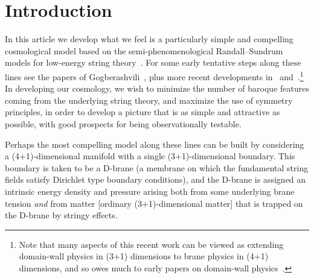 \documentclass[a4paper,12pt]{article}
\begin{document}
\def\d{{\mathrm d}}
\def\ie{{\em i.e.\/}}
\def\eg{{\em e.g.\/}}
\def\etc{{\em etc.\/}}
\def\etal{{\em et al.\/}}
\def\S{{\mathcal S}}
\def\I{{\mathcal I}}
\def\L{{\mathcal L}}
\def\R{{\mathcal R}}
\def\M{{\mathcal M}}
\def\H{{\mathcal H}}
\def\tr{{\mathrm{tr}}}
\def\implies{\Rightarrow}
\def\half{{1\over2}}
\def\normal{{\mathrm{normal}}}
\def\induced{{\mathrm{induced}}}
\def\stringy{{\mathrm{stringy}}}
\def\graviton{{\mathrm{graviton}}}
\def\critical{{\mathrm{critical}}}
\def\eff{{\mathrm{eff}}}
\def\surface{{\mathrm{surface}}}
\def\bulk{{\mathrm{bulk}}}
\def\boundary{{\mathrm{boundary}}}
\def\matter{{\mathrm{matter}}}
\def\Newton{{\mathrm{Newton}}}
\def\Planck{{\mathrm{Planck}}}
\def\Nordstrom{{Nordstr\"om}}
\def\RNdS{Reissner--\Nordstrom--de~Sitter}
\def\t{{\hat{t}}}
\def\th{{\hat{\theta}}}
\def\SIZE{1.00} %



\clearpage
\section{Introduction}
\label{S:intro}


In this article we develop what we feel is a particularly simple and
compelling cosmological model based on the semi-phenomenological
Randall--Sundrum models for low-energy string theory~\cite{RS1,RS2}.
For some early tentative steps along these lines see the papers of
Gogberashvili~\cite{Gogberashvili1}, plus more recent developments
in~\cite{Gogberashvili2} and~\cite{RS-cosmology}.\footnote{
Note that many aspects of this recent work can be viewed as extending
domain-wall physics in (3+1) dimensions to brane physics in (4+1)
dimensions, and so owes much to early papers on domain-wall
physics~\cite{Domain-wall}.}
In developing our cosmology, we wish to minimize the number of baroque
features coming from the underlying string theory, and maximize the
use of symmetry principles, in order to develop a picture that is as
simple and attractive as possible, with good prospects for being
observationally testable.

Perhaps the most compelling model along these lines can be built by
considering a (4+1)-dimensional manifold with a single
(3+1)-dimensional boundary. This boundary is taken to be a D-brane (a
membrane on which the fundamental string fields satisfy Dirichlet type
boundary conditions), and the D-brane is assigned an intrinsic energy
density and pressure arising both from some underlying brane tension
{\em and\/} from matter [ordinary (3+1)-dimensional matter] that is
trapped on the D-brane by stringy effects.
\end{document}
